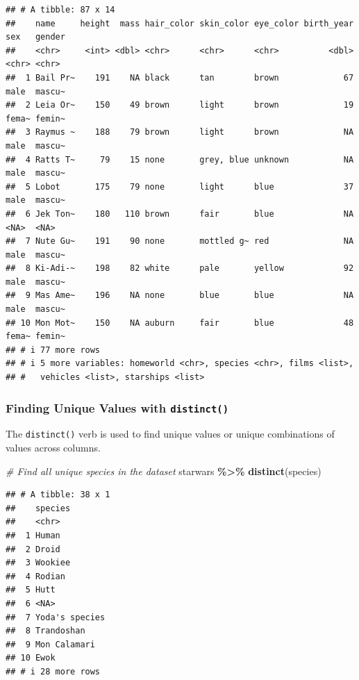 \documentclass[
  11pt,
]{article}
\newenvironment{Shaded}{\begin{snugshade}}{\end{snugshade}}
\newcommand{\CommentTok}[1]{\textcolor[rgb]{0.56,0.35,0.01}{\textit{#1}}}
\newcommand{\FunctionTok}[1]{\textcolor[rgb]{0.13,0.29,0.53}{\textbf{#1}}}
\newcommand{\NormalTok}[1]{#1}
\newcommand{\SpecialCharTok}[1]{\textcolor[rgb]{0.81,0.36,0.00}{\textbf{#1}}}
\begin{document}
\begin{verbatim}
## # A tibble: 87 x 14
##    name     height  mass hair_color skin_color eye_color birth_year sex   gender
##    <chr>     <int> <dbl> <chr>      <chr>      <chr>          <dbl> <chr> <chr> 
##  1 Bail Pr~    191    NA black      tan        brown             67 male  mascu~
##  2 Leia Or~    150    49 brown      light      brown             19 fema~ femin~
##  3 Raymus ~    188    79 brown      light      brown             NA male  mascu~
##  4 Ratts T~     79    15 none       grey, blue unknown           NA male  mascu~
##  5 Lobot       175    79 none       light      blue              37 male  mascu~
##  6 Jek Ton~    180   110 brown      fair       blue              NA <NA>  <NA>  
##  7 Nute Gu~    191    90 none       mottled g~ red               NA male  mascu~
##  8 Ki-Adi-~    198    82 white      pale       yellow            92 male  mascu~
##  9 Mas Ame~    196    NA none       blue       blue              NA male  mascu~
## 10 Mon Mot~    150    NA auburn     fair       blue              48 fema~ femin~
## # i 77 more rows
## # i 5 more variables: homeworld <chr>, species <chr>, films <list>,
## #   vehicles <list>, starships <list>
\end{verbatim}

\subsubsection{\texorpdfstring{Finding Unique Values with
\texttt{distinct()}}{Finding Unique Values with distinct()}}\label{finding-unique-values-with-distinct}

The \texttt{distinct()} verb is used to find unique values or unique
combinations of values across columns.

\begin{Shaded}
\begin{Highlighting}[]
\CommentTok{\# Find all unique species in the dataset}
\NormalTok{starwars }\SpecialCharTok{\%\textgreater{}\%} 
  \FunctionTok{distinct}\NormalTok{(species)}
\end{Highlighting}
\end{Shaded}

\begin{verbatim}
## # A tibble: 38 x 1
##    species       
##    <chr>         
##  1 Human         
##  2 Droid         
##  3 Wookiee       
##  4 Rodian        
##  5 Hutt          
##  6 <NA>          
##  7 Yoda's species
##  8 Trandoshan    
##  9 Mon Calamari  
## 10 Ewok          
## # i 28 more rows
\end{verbatim}
\end{document}
